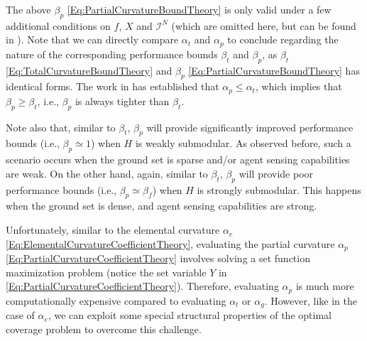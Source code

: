 \documentclass[letterpaper, 10 pt, conference]{ieeeconf}
\begin{document}
The above $\beta_p$ \eqref{Eq:PartialCurvatureBoundTheory} is only valid under a few additional conditions on $f$, $X$ and $\mathcal{I}^N$ (which are omitted here, but can be found in \cite{Liu2018}). Note that we can directly compare $\alpha_t$ and $\alpha_p$ to conclude regarding the nature of the corresponding performance bounds $\beta_t$ and $\beta_p$, as $\beta_t$ \eqref{Eq:TotalCurvatureBoundTheory} and $\beta_p$ \eqref{Eq:PartialCurvatureBoundTheory} has identical forms. The work in \cite{Liu2018} has established that $\alpha_p \leq \alpha_t$, which implies that $\beta_p \geq \beta_t$, i.e., $\beta_p$ is always tighter than $\beta_t$. 

Note also that, similar to $\beta_t$, $\beta_p$ will provide significantly improved performance bounds (i.e., $\beta_p \simeq 1$) when $H$ is weakly submodular. As observed before, such a scenario occurs when the ground set is sparse and/or agent sensing capabilities are weak. On the other hand, again, similar to $\beta_t$, $\beta_p$ will provide poor performance bounds (i.e., $\beta_p \simeq \beta_f$) when $H$ is strongly submodular. This happens when the ground set is dense, and agent sensing capabilities are strong.  


Unfortunately, similar to the elemental curvature $\alpha_e$ \eqref{Eq:ElementalCurvatureCoefficientTheory}, evaluating the partial curvature $\alpha_p$ \eqref{Eq:PartialCurvatureCoefficientTheory} involves solving a set function maximization problem (notice the set variable $Y$ in \eqref{Eq:PartialCurvatureCoefficientTheory}). Therefore, evaluating $\alpha_p$ is much more computationally expensive compared to evaluating $\alpha_t$ or $\alpha_g$. However, like in the case of  $\alpha_e$, we can exploit some special structural properties of the optimal coverage problem to overcome this challenge. 
\end{document}
